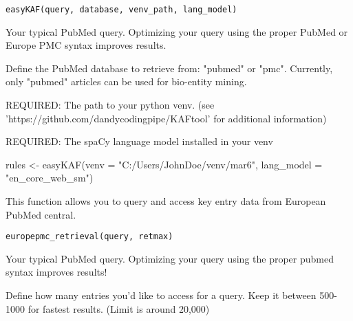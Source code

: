 \documentclass[a4paper]{book}
\begin{document}
%
\begin{Usage}
\begin{verbatim}
easyKAF(query, database, venv_path, lang_model)
\end{verbatim}
\end{Usage}
%
\begin{Arguments}
\begin{ldescription}
\item[\code{query}] Your typical PubMed query. Optimizing your query using the proper PubMed or Europe PMC syntax improves results.

\item[\code{database}] Define the PubMed database to retrieve from: "pubmed" or "pmc". Currently, only "pubmed" articles can be used for bio-entity mining.

\item[\code{venv\_path}] REQUIRED: The path to your python venv. (see 'https://github.com/dandycodingpipe/KAFtool' for additional information)

\item[\code{lang\_model}] REQUIRED: The spaCy language model installed in your venv
\end{ldescription}
\end{Arguments}
%
\begin{Examples}
\begin{ExampleCode}
rules <- easyKAF(venv = "C:/Users/JohnDoe/venv/mar6", lang_model = "en_core_web_sm")
\end{ExampleCode}
\end{Examples}
%
\begin{Description}\relax
This function allows you to query and access key entry data from European PubMed central.
\end{Description}
%
\begin{Usage}
\begin{verbatim}
europepmc_retrieval(query, retmax)
\end{verbatim}
\end{Usage}
%
\begin{Arguments}
\begin{ldescription}
\item[\code{query}] Your typical PubMed query. Optimizing your query using the proper pubmed syntax improves results!

\item[\code{retmax}] Define how many entries you'd like to access for a query. Keep it between 500-1000 for fastest results. (Limit is around 20,000)
\end{ldescription}
\end{Arguments}
\end{document}

